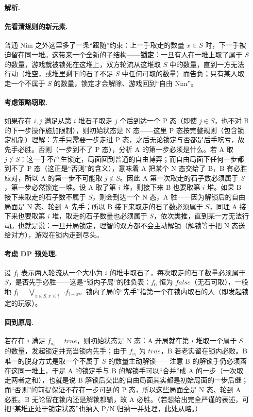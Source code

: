 \documentclass[UTF8,a4paper,11pt,oneside,openany,fontset=fandol]{ctexbook}
\theoremstyle{definition}
\newcommand{\sol}{\par\noindent\textbf{解析.}\ }
\begin{document}
\sol \paragraph{先看清规则的新元素.} 普通 Nim 之外这里多了一条“跟随”约束：上一手取走的数量 $x\in S$ 时，下一手被迫留在同一堆。这带来一个全新的子结构——\textbf{锁定}：一旦有人在一堆上取了属于 $S$ 的数量，游戏就被锁死在这堆上，双方轮流从这堆取 $S$ 中的数量，直到一方无法行动（堆空，或堆里剩下的石子不足 $S$ 中任何可取的数量）而告负；只有某人取走一个不属于 $S$ 的数量，锁定才会解除、游戏回到“自由 Nim”。

\paragraph{考虑策略窃取.} 如果存在 $i,j$ 满足从第 $i$ 堆石子取走 $j$ 个后到达一个 P 态（即使 $j\in S$，也不对 B 的下一步操作施加限制），则初始状态是 N 态——这里 P 态按完整规则（包含锁定机制）理解：先手只需要一步走进 P 态，之后无论锁定与否都是后手吃亏，故先手必胜。否则（一步到不了 P 态），分析 A 的第一步必须是什么。若 A 取 $j\notin S$：这一手不产生锁定，局面回到普通的自由博弈；而自由局面下任何一步都到不了 P 态（这正是“否则”的含义），意味着 A 把某个 N 态交给了 B，B 有必胜应对，所以 A 的第一步不可能取 $j\notin S$。因此 A 第一次取走的石子数必须属于 $S$，第一步必然锁定一堆。设 A 取了第 $i$ 堆，则接下来 B 也要取第 $i$ 堆。如果 B 接下来取走的石子数不属于 $S$，则会到达一个 N 态，A 胜——因为解锁后的自由局面是 N 态、轮到 A 先手；所以 B 接下来取走的石子数必须属于 $S$，同理 A 接下来也要取第 $i$ 堆，取走的石子数量也必须属于 $S$，依次类推，直到某一方无法行动。也就是说：一旦开局锁定，理智的双方都不会主动解锁（解锁等于把 N 态送给对方），游戏在锁内走到尽头。

\paragraph{考虑 DP 预处理.} 设 $f_i$ 表示两人轮流从一个大小为 $i$ 的堆中取石子，每次取走的石子数量必须属于 $S$，是否先手必胜——这是“锁内子局”的胜负表：$f_0$ 恒为 $false$（无石可取），一般地 $f_i=\bigvee_{x\in S,x\le i}\lnot f_{i-x}$。锁内子局的“先手”指第一个在锁内取石的人（即发起锁定的玩家）。

\paragraph{回到原局.} 若存在 $i$ 满足 $f_{a_i}=true$，则初始状态是 N 态：A 开局就在第 $i$ 堆取一个属于 $S$ 的数量，发起锁定并充当锁内先手；由于 $f_{a_i}$ 为 $true$，B 若老实留在锁内必败。B 唯一的脱身方式是取一个不属于 $S$ 的数量主动解锁——注意 B 的解锁手仍必须落在这同一堆上，于是 A 的锁定手与 B 的解锁手可以“合并”成 A 的一步（一次取走两者之和），也就是说 B 解锁后交出的自由局面其实都是初始局面的一步后继；而“否则”的前提保证不存在一步可到的 P 态，所以这些局面全是 N 态、轮到 A 必胜。B 无论留在锁内还是解锁都输，故 A 必胜。（若想给出完全严谨的表述，可把“某堆正处于锁定状态”也纳入 P/N 归纳一并处理，此处从略。）
\end{document}
